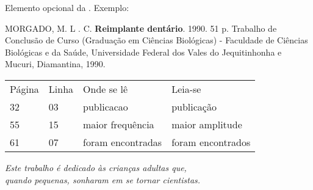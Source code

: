\documentclass[
12pt,				%
openright,			%
twoside,			%
a4paper,			%
chapter=TITLE,		%
english,			%
brazil				%
]{abntex2}
\begin{document}
\begin{errata}

Elemento opcional da \textcite{NBR14724:2011}. Exemplo:

MORGADO, M. L . C. \textbf{Reimplante dentário}. 1990. 51 p. Trabalho de Conclusão de Curso (Graduação em Ciências Biológicas) - Faculdade de Ciências Biológicas e da Saúde, Universidade Federal dos Vales do Jequitinhonha e Mucuri, Diamantina, 1990.

\begin{table}[htb]
	\centering
	\begin{tabular}{p{1cm}p{1cm}p{6cm}p{6cm}}
		
		Página & Linha  & Onde se lê  & Leia-se  \\
		
		32 & 03 & publicacao & publicação\\
		55 & 15 & maior frequência & maior amplitude\\
		61 & 07 & foram encontradas & foram encontrados\\
		
	\end{tabular}
\end{table}

\end{errata}

%
% 

\imprimirfolhadeaprovacao

\begin{dedicatoria}
   \vspace*{\fill}
   \centering
   \noindent
   \textit{ Este trabalho é dedicado às crianças adultas que,\\
   quando pequenas, sonharam em se tornar cientistas.} \vspace*{\fill}
\end{dedicatoria}
\end{document}
